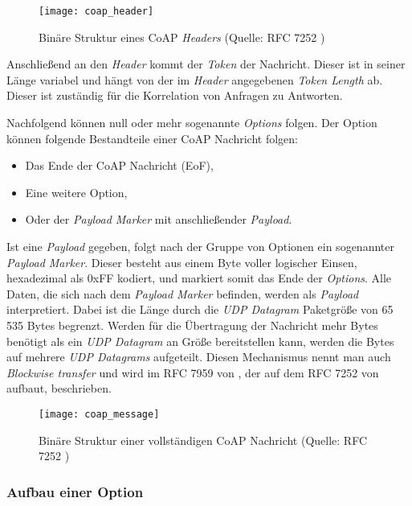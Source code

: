 \begin{figure}[h]
    \centering
    \texttt{[image: coap\_header]}
    \caption{Binäre Struktur eines CoAP \textit{Headers} (Quelle: RFC 7252 \autocite{RFC7252})}
    \label{fig:binaere-sturktur-eines-coap-headers}
\end{figure}

Anschließend an den \textit{Header} kommt der \textit{Token} der Nachricht. Dieser ist in seiner Länge variabel und hängt von der im \textit{Header} angegebenen \textit{Token Length} ab. Dieser ist zuständig für die Korrelation von Anfragen zu Antworten.

Nachfolgend können null oder mehr sogenannte \textit{Options} folgen. Der Option können folgende Bestandteile einer CoAP Nachricht folgen:
\begin{itemize}
    \item Das Ende der CoAP Nachricht (EoF),
    \item Eine weitere Option,
    \item Oder der \textit{Payload Marker} mit anschließender \textit{Payload}.
\end{itemize}

Ist eine \textit{Payload} gegeben, folgt nach der Gruppe von Optionen ein sogenannter \textit{Payload Marker}. Dieser besteht aus einem Byte voller logischer Einsen, hexadezimal als 0xFF kodiert, und markiert somit das Ende der \textit{Options}. Alle Daten, die sich nach dem \textit{Payload Marker} befinden, werden als \textit{Payload} interpretiert. Dabei ist die Länge durch die \textit{UDP Datagram} Paketgröße von 65 535 Bytes begrenzt. Werden für die Übertragung der Nachricht mehr Bytes benötigt als ein \textit{UDP Datagram} an Größe bereitstellen kann, werden die Bytes auf mehrere \textit{UDP Datagrams} aufgeteilt. Diesen Mechanismus nennt man auch \textit{Blockwise transfer} und wird im RFC 7959 von \citeauthor{RFC7959} \cite{RFC7959}, der auf dem RFC 7252 von \citeauthor{RFC7252} \autocite{RFC7252} aufbaut, beschrieben.

\begin{figure}[h]
    \centering
    \texttt{[image: coap\_message]}
    \caption{Binäre Struktur einer vollständigen CoAP Nachricht (Quelle: RFC 7252 \autocite{RFC7252})}
    \label{fig:binaere-sturktur-einer-vollstaendigen-coap-nachricht}
\end{figure}

\subsubsection{Aufbau einer Option}
\label{subsubsec:aufbau-einer-option}

